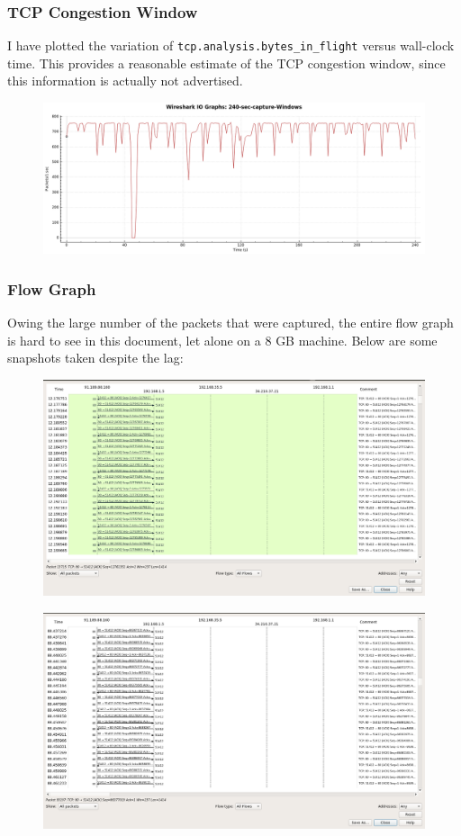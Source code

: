 \documentclass{article}
\begin{document}
\subsubsection{TCP Congestion Window}
\begin{flushleft}
I have plotted the variation of \texttt{tcp.analysis.bytes\_in\_flight} versus wall-clock time. This provides a reasonable estimate of the TCP congestion window, since this information is actually not advertised.
\begin{figure}[H]
\centering
\includegraphics[width=0.75\linewidth]{tcp-CWND.png}
\end{figure}
\end{flushleft}

\subsubsection{Flow Graph}
\begin{flushleft}
Owing the large number of the packets that were captured, the entire flow graph is hard to see in this document, let alone on a 8 GB machine. Below are some snapshots taken despite the lag:
\begin{figure}[H]
\centering
\includegraphics[width=0.6\linewidth]{flow-graph-1.png}
\end{figure}
\begin{figure}[H]
\centering
\includegraphics[width=0.6\linewidth]{flow-graph-2.png}
\end{figure}
\end{flushleft}
\end{document}
